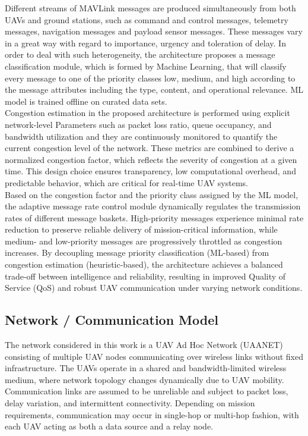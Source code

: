 \documentclass[pdflatex,sn-mathphys-num]{sn-jnl}%
\theoremstyle{thmstyleone}%
\theoremstyle{thmstyletwo}%
\theoremstyle{thmstylethree}%
\begin{document}
Different streams of MAVLink messages are produced simultaneously from both UAVs and ground stations, such as command and control messages, telemetry messages, navigation messages and payload sensor messages. These messages vary in a great way with regard to importance, urgency and toleration of delay. In order to deal with such heterogeneity, the architecture proposes a message classification module, which is formed by Machine Learning, that will classify every message to one of the priority classes low, medium, and high according to the message attributes including the type, content, and operational relevance. ML model is trained offline on curated data sets.\\



Congestion estimation in the proposed architecture is performed using explicit network-level Parameters such as packet loss ratio, queue occupancy, and bandwidth utilization and they are continuously monitored to quantify the current congestion level of the network. These metrics are combined to derive a normalized congestion factor, which reflects the severity of congestion at a given time. This design choice ensures transparency, low computational overhead, and predictable behavior, which are critical for real-time UAV systems.\\


Based on the congestion factor and the priority class assigned by the ML model, the adaptive message rate control module dynamically regulates the transmission rates of different message baskets. High-priority messages experience minimal rate reduction to preserve reliable delivery of mission-critical information, while medium- and low-priority messages are progressively throttled as congestion increases. By decoupling message priority classification (ML-based) from congestion estimation (heuristic-based), the architecture achieves a balanced trade-off between intelligence and reliability, resulting in improved Quality of Service (QoS) and robust UAV communication under varying network conditions.

\subsection{ Network / Communication Model }

The network considered in this work is a UAV Ad Hoc Network (UAANET) consisting of multiple UAV nodes communicating over wireless links without fixed infrastructure. The UAVs operate in a shared and bandwidth-limited wireless medium, where network topology changes dynamically due to UAV mobility. Communication links are assumed to be unreliable and subject to packet loss, delay variation, and intermittent connectivity. Depending on mission requirements, communication may occur in single-hop or multi-hop fashion, with each UAV acting as both a data source and a relay node.\\
\end{document}
